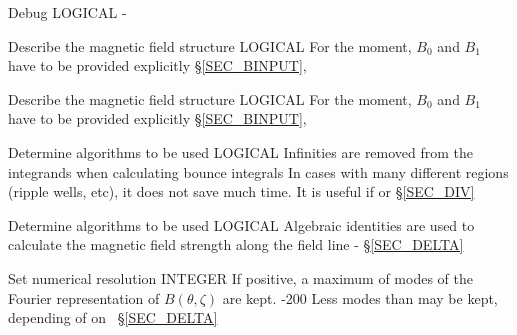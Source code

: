{Debug}
{LOGICAL}
{}
{\false}
{-}
{}

{Describe the magnetic field structure}
{LOGICAL}
{}
{\false}
{For the moment, $B_0$ and $B_1$ have to be provided explicitly}
{\S\ref{SEC_BINPUT}, \citep{calvo2017sqrtnu,velasco2018phi1}}

{Describe the magnetic field structure}
{LOGICAL}
{}
{\false}
{For the moment, $B_0$ and $B_1$ have to be provided explicitly}
{\S\ref{SEC_BINPUT}, \citep{calvo2017sqrtnu,velasco2018phi1}}




{Determine algorithms to be used}
{LOGICAL}
{Infinities are removed from the integrands when calculating bounce integrals}
{\false}
{In cases with many different regions (ripple wells, etc), it does not save much time. It is useful if  or }
{\S\ref{SEC_DIV}}

{Determine algorithms to be used}
{LOGICAL}
{Algebraic identities are used to calculate the magnetic field strength along the field line}
{\true}
{-}
{\S\ref{SEC_DELTA}}

{Set numerical resolution}
{INTEGER}
{If positive, a maximum of  modes of the Fourier representation of $B(\theta,\zeta)$ are kept.}
{-200}
{Less modes than  may be kept, depending of on~}
{\S\ref{SEC_DELTA}}

